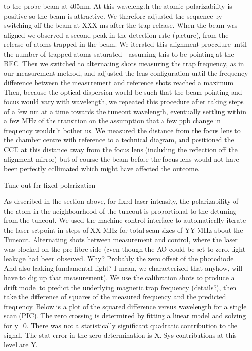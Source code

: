 to the probe beam at 405nm. At this wavelength the atomic polarizability
is positive so the beam is attractive. We therefore adjusted the
sequence by switching off the beam at XXX ms after the trap release.
When the beam was aligned we observed a second peak in the detection
rate (picture), from the release of atoms trapped in the beam. We
iterated this alignment procedure until the number of trapped atoms
saturated - assuming this to be pointing at the BEC. Then we switched to
alternating shots measuring the trap frequency, as in our measurement
method, and adjusted the lens configuration until the frequency
difference between the measurement and reference shots reached a
maximum. Then, because the optical dispersion would be such that the
beam pointing and focus would vary with wavelength, we repeated this
procedure after taking steps of a few nm at a time towards the tuneout
wavelength, eventually settling within a few MHz of the transition on
the assumption that a few ppb change in frequency wouldn't bother us. We
measured the distance from the focus lens to the chamber centre with
reference to a technical diagram, and positioned the CCD at this
distance away from the focus lens (including the reflection off the
alignment mirror) but of course the beam before the focus lens would not
have been perfectly collimated which might have affected the outcome.

Tune-out for fixed polarization


As described in the section above, for fixed laser intensity, the polarizability of the atom in the neighbourhood of the tuneout is proportional to the detuning from the tuneout. We used the machine control interface to automatically iterate the laser setpoint in steps of XX MHz for total scan sizes of YY MHz about the Tuneout. Alternating shots between measurement and control, where the laser was blocked on the pre-fibre side (even though the AO could be set to zero, light leakage had been observed. Why? Probably the zero offset of the photodiode. And also leaking fundamental light? I mean, we characterized that anyhow, will have to dig up that measurement). We use the calibration shots to produce a drift model to predict the underlying magnetic trap frequency (details?), then take the difference of squares of the measured frequency and the predicted frequency. Below is a plot of the squared difference versus wavelength for a single scan (PIC). The zero crossing is determined by fitting a linear model and solving for y=0. There was not a statistically significant quadratic contribution to the signal. The stat error in the zero determination is X. Sys contributions at this level are Y.

